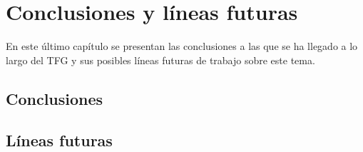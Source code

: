\chapter{Conclusiones y líneas futuras}
\label{CAP:Titulo6}

En este último capítulo se presentan las conclusiones a las que se ha llegado a lo largo del TFG y sus posibles líneas futuras de trabajo sobre este tema.

\section{Conclusiones}
\label{Conclusiones}


\section{Líneas futuras}
\label{Líneas futuras}

\pagebreak
